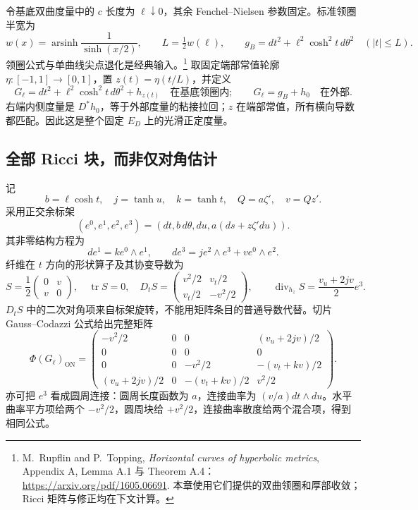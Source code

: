 \documentclass[UTF8,fontset=fandol,zihao=-4,oneside,openany]{ctexbook}
\theoremstyle{cjkplain}
\numberwithin{equation}{chapter}
\begin{document}
令基底双曲度量中的 $c$ 长度为 $\ell\downarrow0$，其余 Fenchel--Nielsen 参数固定。标准领圈半宽为
\begin{equation}
 w(x)=\operatorname{arsinh}\frac1{\sinh(x/2)},\qquad
 L=\tfrac12w(\ell),\qquad
 g_B=dt^2+\ell^2\cosh^2t\,d\theta^2\quad(|t|\le L).
 \label{BUN:collar}
\end{equation}
领圈公式与单曲线尖点退化是经典输入。\footnote{M.~Rupflin and P.~Topping, \emph{Horizontal curves of hyperbolic metrics}, Appendix A, Lemma A.1 与 Theorem A.4：\url{https://arxiv.org/pdf/1605.06691}. 本章使用它们提供的双曲领圈和厚部收敛；Ricci 矩阵与修正均在下文计算。}
取固定端部常值轮廓 $\eta:[-1,1]\to[0,1]$，置 $z(t)=\eta(t/L)$，并定义
\begin{equation}
 G_\ell=dt^2+\ell^2\cosh^2t\,d\theta^2+h_{z(t)}
 \quad\text{在基底领圈内};\qquad
 G_\ell=g_B+h_0\quad\text{在外部}.
 \label{BUN:slow-metric}
\end{equation}
右端内侧度量是 $D^*h_0$，等于外部度量的粘接拉回；$z$ 在端部常值，所有横向导数都匹配。因此这是整个固定 $E_D$ 上的光滑正定度量。

\subsection{全部 Ricci 块，而非仅对角估计}
记
\[
 b=\ell\cosh t,\quad j=\tanh u,\quad k=\tanh t,
 \quad Q=a\zeta',\quad v=Qz'.
\]
采用正交余标架
\[
 (e^0,e^1,e^2,e^3)=(dt,b\,d\theta,du,a(ds+z\zeta' du)).
\]
其非零结构方程为
\[
 de^1=k e^0\wedge e^1,\qquad
 de^3=j e^2\wedge e^3+v e^0\wedge e^2.
\]
纤维在 $t$ 方向的形状算子及其协变导数为
\begin{equation}
 S=\frac12\begin{pmatrix}0&v\\v&0\end{pmatrix},\quad
 \operatorname{tr}S=0,\quad
 D_tS=\begin{pmatrix}v^2/2&v_t/2\\v_t/2&-v^2/2\end{pmatrix},
 \qquad \operatorname{div}_{h_z}S=\frac{v_u+2jv}{2}e^3.
 \label{BUN:shape}
\end{equation}
$D_tS$ 中的二次对角项来自标架旋转，不能用矩阵条目的普通导数代替。切片 Gauss--Codazzi 公式给出完整矩阵
\begin{equation}
 \boxed{
 \Phi(G_\ell)_{\mathrm{ON}}=
 \begin{pmatrix}
 -v^2/2&0&0&(v_u+2jv)/2\\
 0&0&0&0\\
 0&0&-v^2/2&-(v_t+kv)/2\\
 (v_u+2jv)/2&0&-(v_t+kv)/2&v^2/2
 \end{pmatrix}.}
 \label{BUN:ricci-matrix}
\end{equation}
亦可把 $e^3$ 看成圆周连接：圆周长度函数为 $a$，连接曲率为 $(v/a)dt\wedge du$。水平曲率平方项给两个 $-v^2/2$，圆周块给 $+v^2/2$，连接曲率散度给两个混合项，得到相同公式。
\end{document}
